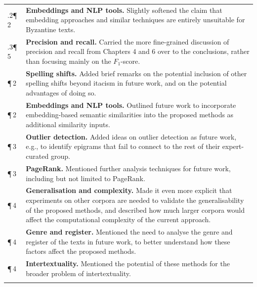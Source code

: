 \documentclass[11pt,a4paper]{article}
\makeatletter
\newlength{\loccol}
\newenvironment{changes}{%
  \begin{tabular}{@{}>{\raggedright\arraybackslash}p{\loccol}
                     >{\raggedright\arraybackslash}p{\dimexpr\textwidth-\loccol-2\tabcolsep\relax}@{}}
    \toprule
}{%
    \bottomrule
  \end{tabular}\par
}
\newcommand{\change}[2]{#1 & #2 \\ \addlinespace[0.45em]}
\newcommand{\loc}[2]{#1\enspace #2}
\newcommand{\topic}[1]{\textbf{#1.}}
\makeatother
\begin{document}
\begin{changes}
  \change{\loc{7.2.2}{¶\,2}}{\topic{Embeddings and NLP tools} Slightly softened the claim that embedding approaches and similar techniques are entirely unsuitable for Byzantine texts.}
  \change{\loc{7.2.3}{¶\,5}}{\topic{Precision and recall} Carried the more fine-grained discussion of precision and recall from Chapters 4 and 6 over to the conclusions, rather than focusing mainly on the $F_1$-score.}
  \change{\loc{7.5}{¶\,2}}{\topic{Spelling shifts} Added brief remarks on the potential inclusion of other spelling shifts beyond itacism in future work, and on the potential advantages of doing so.}
  \change{\loc{7.5}{¶\,2}}{\topic{Embeddings and NLP tools} Outlined future work to incorporate embedding-based semantic similarities into the proposed methods as additional similarity inputs.}
  \change{\loc{7.5}{¶\,3}}{\topic{Outlier detection} Added ideas on outlier detection as future work, e.g., to identify epigrams that fail to connect to the rest of their expert-curated group.}
  \change{\loc{7.5}{¶\,3}}{\topic{PageRank} Mentioned further analysis techniques for future work, including but not limited to PageRank.}
  \change{\loc{7.5}{¶\,4}}{\topic{Generalisation and complexity} Made it even more explicit that experiments on other corpora are needed to validate the generalisability of the proposed methods, and described how much larger corpora would affect the computational complexity of the current approach.}
  \change{\loc{7.5}{¶\,4}}{\topic{Genre and register} Mentioned the need to analyse the genre and register of the texts in future work, to better understand how these factors affect the proposed methods.}
  \change{\loc{7.5}{¶\,4}}{\topic{Intertextuality} Mentioned the potential of these methods for the broader problem of intertextuality.}
\end{changes}
\end{document}
